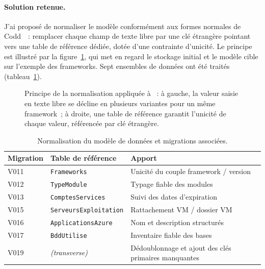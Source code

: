 \paragraph{Solution retenue.}
J'ai proposé de normaliser le modèle conformément aux formes normales de
Codd~\cite{codd1970relational}~: remplacer chaque champ de texte libre par une
clé étrangère pointant vers une table de référence dédiée, dotée d'une
contrainte d'unicité. Le principe est illustré par la
figure~\ref{fig:normalisation}, qui met en regard le stockage initial et le
modèle cible sur l'exemple des frameworks.
Sept ensembles de données ont été traités (tableau~\ref{tab:normalisation}).

\begin{figure}[H]
  \centering
  \caption{Principe de la normalisation appliquée à \csbag~: à gauche, la valeur
    saisie en texte libre se décline en plusieurs variantes pour un même
    framework~; à droite, une table de référence garantit l'unicité de chaque
    valeur, référencée par clé étrangère.}
  \label{fig:normalisation}
\end{figure}

\begin{table}[H]
  \centering
  \caption{Normalisation du modèle de données et migrations associées.}
  \label{tab:normalisation}
  \small
  \begin{tabularx}{\textwidth}{@{}llX@{}}
    \toprule
    \textbf{Migration} & \textbf{Table de référence} & \textbf{Apport} \\
    \midrule
    V011 & \texttt{Frameworks}            & Unicité du couple framework / version \\
    V012 & \texttt{TypeModule}            & Typage fiable des modules \\
    V013 & \texttt{ComptesServices}       & Suivi des dates d'expiration \\
    V015 & \texttt{ServeursExploitation}  & Rattachement VM / dossier VM \\
    V016 & \texttt{ApplicationsAzure}     & Nom et description structurés \\
    V017 & \texttt{BddUtilise}            & Inventaire fiable des bases \\
    V019 & \textit{(transverse)}          & Dédoublonnage et ajout des clés primaires manquantes \\
    \bottomrule
  \end{tabularx}
\end{table}

